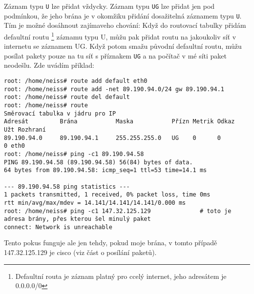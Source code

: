 Záznam typu \verb|U| lze přidat vždycky. Záznam typu \verb|UG| lze přidat jen pod podmínkou, že jeho brána je v okomžiku přidání dosažitelná záznamem typu \verb|U|. Tím je možné dosáhnout zajímaveho chování: Když do routovací tabulky přidám defaultní routu \footnote{Defaultní routa je záznam platný pro ccelý internet, jeho adresátem je 0.0.0.0/0} záznamu typu U, můžu pak přidat routu na jakoukoliv síť v internetu se záznamem UG. Když potom smažu původní defaultní routu, můžu posílat pakety pouze na tu síť s příznakem \verb|UG| a na počítač v mé síti paket neodešlu. Zde uvádím příklad:
\begin{verbatim}
root: /home/neiss# route add default eth0
root: /home/neiss# route add -net 89.190.94.0/24 gw 89.190.94.1
root: /home/neiss# route del default
root: /home/neiss# route
Směrovací tabulka v jádru pro IP
Adresát         Brána           Maska           Přízn Metrik Odkaz  Užt Rozhraní
89.190.94.0     89.190.94.1     255.255.255.0   UG    0      0        0 eth0
root: /home/neiss# ping -c1 89.190.94.58
PING 89.190.94.58 (89.190.94.58) 56(84) bytes of data.
64 bytes from 89.190.94.58: icmp_seq=1 ttl=53 time=14.1 ms

--- 89.190.94.58 ping statistics ---
1 packets transmitted, 1 received, 0% packet loss, time 0ms
rtt min/avg/max/mdev = 14.141/14.141/14.141/0.000 ms
root: /home/neiss# ping -c1 147.32.125.129				# toto je adresa brány, přes kterou šel minulý paket
connect: Network is unreachable
\end{verbatim}
Tento pokus funguje ale jen tehdy, pokud moje brána, v tomto případě 147.32.125.129 je cisco (viz část o posílání paketů).

